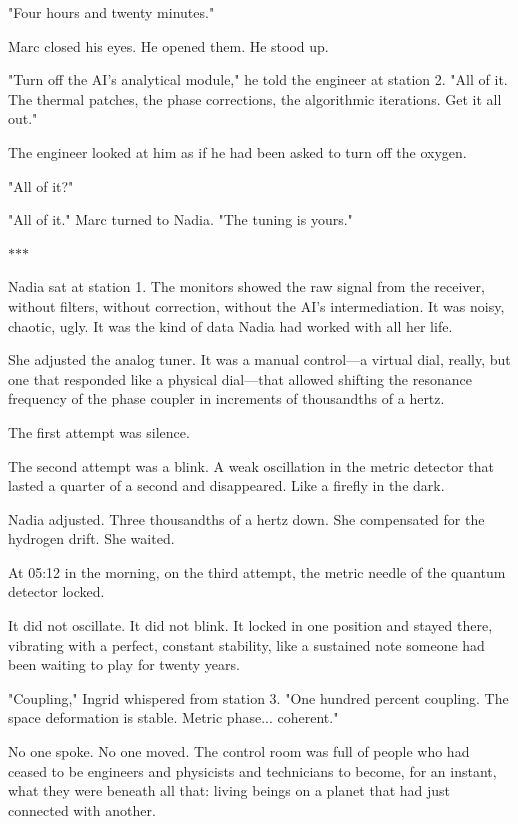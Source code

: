 \documentclass[11pt,a5paper,twoside]{book}
\begin{document}
"Four hours and twenty minutes."

Marc closed his eyes. He opened them. He stood up.

"Turn off the AI's analytical module," he told the engineer at station 2. "All of it. The thermal patches, the phase corrections, the algorithmic iterations. Get it all out."

The engineer looked at him as if he had been asked to turn off the oxygen.

"All of it?"

"All of it." Marc turned to Nadia. "The tuning is yours."

\vspace{1.5em}
\begin{center}$\ast$\quad$\ast$\quad$\ast$\end{center}
\vspace{1.5em}

Nadia sat at station 1. The monitors showed the raw signal from the receiver, without filters, without correction, without the AI's intermediation. It was noisy, chaotic, ugly. It was the kind of data Nadia had worked with all her life.

She adjusted the analog tuner. It was a manual control—a virtual dial, really, but one that responded like a physical dial—that allowed shifting the resonance frequency of the phase coupler in increments of thousandths of a hertz.

The first attempt was silence.

The second attempt was a blink. A weak oscillation in the metric detector that lasted a quarter of a second and disappeared. Like a firefly in the dark.

Nadia adjusted. Three thousandths of a hertz down. She compensated for the hydrogen drift. She waited.

At 05:12 in the morning, on the third attempt, the metric needle of the quantum detector locked.

It did not oscillate. It did not blink. It locked in one position and stayed there, vibrating with a perfect, constant stability, like a sustained note someone had been waiting to play for twenty years.

"Coupling," Ingrid whispered from station 3. "One hundred percent coupling. The space deformation is stable. Metric phase... coherent."

No one spoke. No one moved. The control room was full of people who had ceased to be engineers and physicists and technicians to become, for an instant, what they were beneath all that: living beings on a planet that had just connected with another.
\end{document}
